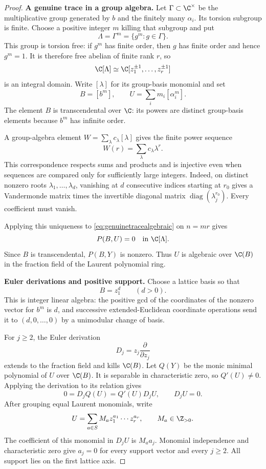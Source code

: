 \begin{proof}
\par\smallskip\noindent\textbf{A genuine trace in a group algebra.}\quad
Let $\Gamma\subset\C^\times$ be the multiplicative group
generated by $b$ and the finitely many $\alpha_i$.
Its torsion subgroup is finite. Choose a positive integer
$m$ killing that subgroup and put
\[
 \Lambda=\Gamma^m=\{g^m:g\in\Gamma\}.
\]
This group is torsion free: if $g^m$ has finite order,
then $g$ has finite order and hence $g^m=1$.
It is therefore free abelian of finite rank $r$, so
\[
 \C[\Lambda]\simeq
 \C[z_1^{\pm1},\ldots,z_r^{\pm1}]
\]
is an integral domain.
Write $[\lambda]$ for its group-basis monomial and set
\[
 B=[b^m],\qquad U=\sum_i m_i[\alpha_i^m].
\]
The element $B$ is transcendental over $\C$: its powers
are distinct group-basis elements because $b^m$ has
infinite order.

A group-algebra element $W=\sum_\lambda c_\lambda[\lambda]$
gives the finite power sequence
\[
 W(r)=\sum_\lambda c_\lambda\lambda^r.
\]
This correspondence respects sums and products and is
injective even when sequences are compared only for
sufficiently large integers.
Indeed, on distinct nonzero roots
$\lambda_1,\ldots,\lambda_d$, vanishing at $d$ consecutive
indices starting at $r_0$ gives a Vandermonde matrix
times the invertible diagonal matrix
$\operatorname{diag}(\lambda_j^{r_0})$.
Every coefficient must vanish.

Applying this uniqueness to
\eqref{eq:genuinetracealgebraic} on $n=mr$ gives
\begin{equation}\label{eq:genuinegroupring}
 P(B,U)=0\quad\text{in }\C[\Lambda].
\end{equation}
Since $B$ is transcendental, $P(B,Y)$ is nonzero.
Thus $U$ is algebraic over $\C(B)$ in the fraction
field of the Laurent polynomial ring.

\par\smallskip\noindent\textbf{Euler derivations and positive support.}\quad
Choose a lattice basis so that
\[
 B=z_1^d\qquad(d>0).
\]
This is integer linear algebra: the positive gcd of
the coordinates of the nonzero vector for $b^m$ is
$d$, and successive extended-Euclidean coordinate
operations send it to $(d,0,\ldots,0)$ by a
unimodular change of basis.

For $j\ge2$, the Euler derivation
\[
 D_j=z_j\frac{\partial}{\partial z_j}
\]
extends to the fraction field and kills $\C(B)$.
Let $Q(Y)$ be the monic minimal polynomial of $U$
over $\C(B)$. It is separable in characteristic zero,
so $Q'(U)\ne0$.
Applying the derivation to its relation gives
\[
 0=D_jQ(U)=Q'(U)D_jU,\qquad D_jU=0.
\]
After grouping equal Laurent monomials, write
\[
 U=\sum_{a\in S}M_a z_1^{a_1}\cdots z_r^{a_r},
 \qquad M_a\in\Z_{>0}.
\]
The coefficient of this monomial in $D_jU$ is
$M_a a_j$.
Monomial independence and characteristic zero give
$a_j=0$ for every support vector and every $j\ge2$.
All support lies on the first lattice axis.


\end{proof}
